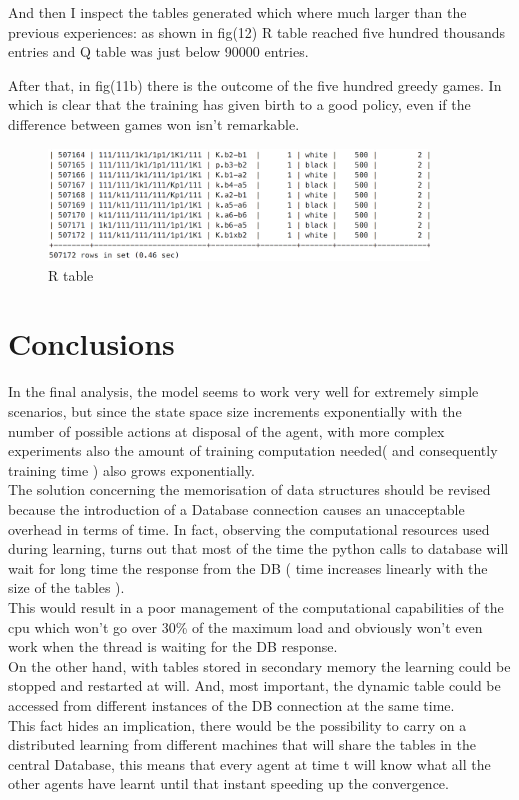 \documentclass{article}
\begin{document}
				And then I inspect the tables generated which where much larger than the previous experiences:
				as shown in fig(12) R table reached five hundred thousands entries and Q table was just below 90000 entries.\medskip\\
\newpage

				After that, in fig(11b) there is the outcome of the five hundred greedy games.
				In which is clear that the training has given birth to a good policy, even if the difference between games won isn't remarkable.\bigskip
				\begin{center}	
\begin{figure}[h!]
\centering
\includegraphics[width=0.9\textwidth]{complex_rtable}
\caption{R table}
\label{fig:12}
\end{figure}
\end{center}


			\section{Conclusions}
			\bigskip\bigskip
			In the final analysis, the model seems to work very well for extremely simple scenarios, but since the state space size increments exponentially with the number of possible actions at disposal of the agent, with more complex experiments also the amount of training computation  needed( and consequently training time ) also grows exponentially.\medskip\\
			The solution concerning the memorisation of data structures should be revised because the introduction of a Database connection causes an unacceptable overhead in terms of time. In fact, observing the computational resources used during learning, turns out that most of the time the python calls to database will wait for long time the response from the DB ( time increases linearly with the size of the tables ).\medskip\\
			This would result in a poor management of the computational capabilities of the cpu which won't go over 30\% of the maximum load and obviously won't even work when the thread is waiting for the DB response.\medskip\\
			On the other hand, with tables stored in secondary memory the learning could be stopped and restarted at will. And, most important, the dynamic table could be accessed from different instances of the DB connection at the same time.\bigskip\\
			This fact hides an implication, there would be the possibility to carry on a distributed learning from different machines that will share the tables in the central Database, this means that every agent at time t will know what all the other agents have learnt until that instant speeding up the convergence.


			
		
				
			
		
\end{document}

